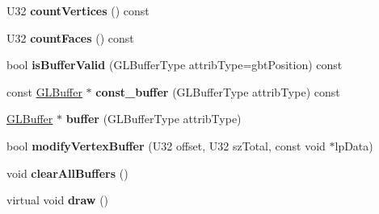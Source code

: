 \begin{DoxyCompactItemize}
\item 
\hypertarget{classps_1_1opengl_1_1GLMesh_a89d62a3f483d6d91448af9905a766a3c}{}U32 {\bfseries count\+Vertices} () const \label{classps_1_1opengl_1_1GLMesh_a89d62a3f483d6d91448af9905a766a3c}

\item 
\hypertarget{classps_1_1opengl_1_1GLMesh_ad5b9d09d188605c4684eb5e2111a7980}{}U32 {\bfseries count\+Faces} () const \label{classps_1_1opengl_1_1GLMesh_ad5b9d09d188605c4684eb5e2111a7980}

\item 
\hypertarget{classps_1_1opengl_1_1GLMesh_a898aeb13042ef88ca1ab8e305af87688}{}bool {\bfseries is\+Buffer\+Valid} (G\+L\+Buffer\+Type attrib\+Type=gbt\+Position) const \label{classps_1_1opengl_1_1GLMesh_a898aeb13042ef88ca1ab8e305af87688}

\item 
\hypertarget{classps_1_1opengl_1_1GLMesh_a3e99f6d363d2a4b9b289e23d778d23de}{}const \hyperlink{classps_1_1opengl_1_1GLBuffer}{G\+L\+Buffer} $\ast$ {\bfseries const\+\_\+buffer} (G\+L\+Buffer\+Type attrib\+Type) const \label{classps_1_1opengl_1_1GLMesh_a3e99f6d363d2a4b9b289e23d778d23de}

\item 
\hypertarget{classps_1_1opengl_1_1GLMesh_a58b9119add26f74ae0008bcd1af44238}{}\hyperlink{classps_1_1opengl_1_1GLBuffer}{G\+L\+Buffer} $\ast$ {\bfseries buffer} (G\+L\+Buffer\+Type attrib\+Type)\label{classps_1_1opengl_1_1GLMesh_a58b9119add26f74ae0008bcd1af44238}

\item 
\hypertarget{classps_1_1opengl_1_1GLMesh_a57e0d0fc417bbda5eef7013eb4542ad5}{}bool {\bfseries modify\+Vertex\+Buffer} (U32 offset, U32 sz\+Total, const void $\ast$lp\+Data)\label{classps_1_1opengl_1_1GLMesh_a57e0d0fc417bbda5eef7013eb4542ad5}

\item 
\hypertarget{classps_1_1opengl_1_1GLMesh_aa59a7234a8e89d6aee84758ab50874ac}{}void {\bfseries clear\+All\+Buffers} ()\label{classps_1_1opengl_1_1GLMesh_aa59a7234a8e89d6aee84758ab50874ac}

\item 
\hypertarget{classps_1_1opengl_1_1GLMesh_a135e8f9a8c85b4b99ca59acf4246a0bd}{}virtual void {\bfseries draw} ()\label{classps_1_1opengl_1_1GLMesh_a135e8f9a8c85b4b99ca59acf4246a0bd}

\end{DoxyCompactItemize}

